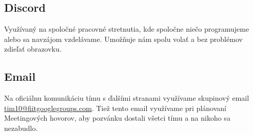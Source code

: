 \documentclass{article}
\begin{document}
        \subsection*{Discord}

            \textnormal{Využívaný na spoločné pracovné stretnutia, kde spoločne niečo programujeme alebo sa navzájom vzdelávame. Umožňuje nám spolu volať a bez problémov zdieľať obrazovku.}

        \subsection*{Email}

            \textnormal{Na oficiálnu komunikáciu tímu s ďalšími stranami využívame skupinový email \href{mailto:tim10@fiitgooglegroups.com}{tim10@fiitgooglegroups.com}. Tiež tento email využívame pri plánovaní Meetingových hovorov, aby pozvánku dostali všetci tímu a na nikoho sa nezabudlo.}
\end{document}

